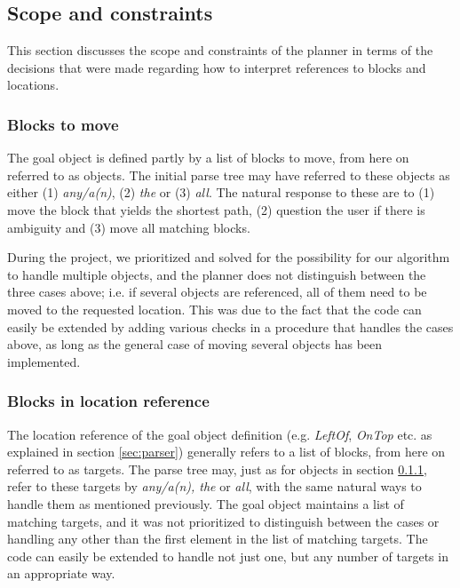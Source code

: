 \subsection{Scope and constraints}

This section discusses the scope and constraints of the planner in terms of the
decisions that were made regarding how to interpret references to blocks and
locations.

\subsubsection{Blocks to move} 
\label{sec:blockstomove}
The goal object is defined partly by a list of blocks to move, from here on
referred to as objects. The initial parse tree may have referred to these
objects as either (1) \textit{any/a(n)}, (2) \textit{the} or (3) \textit{all}.
The natural response to these are to (1) move the block that yields the shortest
path, (2) question the user if there is ambiguity and (3) move all matching
blocks.

During the project, we prioritized and solved for the possibility for our
algorithm to handle multiple objects, and the planner does not distinguish
between the three cases above; i.e. if several objects are referenced, all of
them need to be moved to the requested location. This was due to the fact that
the code can easily be extended by adding various checks in a procedure that
handles the cases above, as long as the general case of moving several objects
has been implemented.

\subsubsection{Blocks in location reference}

The location reference of the goal object definition (e.g. \textit{LeftOf},
\textit{OnTop} etc. as explained in section \ref{sec:parser}) generally refers
to a list of blocks, from here on referred to as targets. The parse tree may,
just as for objects in section \ref{sec:blockstomove}, refer to these targets by
\textit{any/a(n), the} or \textit{all}, with the same natural ways to handle
them as mentioned previously. The goal object maintains a list of matching
targets, and it was not prioritized to distinguish between the cases or handling
any other than the first element in the list of matching targets. The code can
easily be extended to handle not just one, but any number of targets in an
appropriate way.

